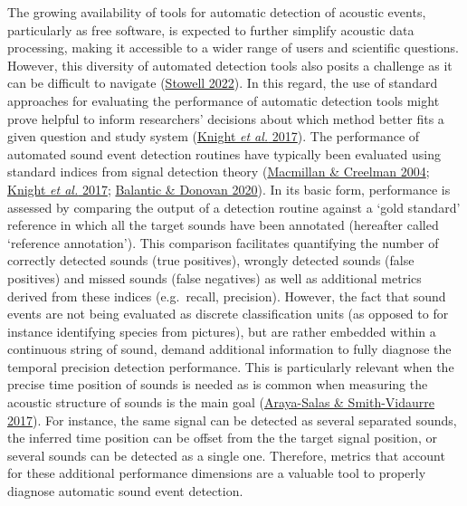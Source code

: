 \documentclass[
]{article}
\begin{document}
The growing availability of tools for automatic detection of acoustic
events, particularly as free software, is expected to further simplify
acoustic data processing, making it accessible to a wider range of users
and scientific questions. However, this diversity of automated detection
tools also posits a challenge as it can be difficult to navigate
(\protect\hyperlink{ref-Stowell2022}{Stowell 2022}). In this regard, the
use of standard approaches for evaluating the performance of automatic
detection tools might prove helpful to inform researchers' decisions
about which method better fits a given question and study system
(\protect\hyperlink{ref-knight2017}{Knight \emph{et al.} 2017}). The
performance of automated sound event detection routines have typically
been evaluated using standard indices from signal detection theory
(\protect\hyperlink{ref-macmillan2004}{Macmillan \& Creelman 2004};
\protect\hyperlink{ref-knight2017}{Knight \emph{et al.} 2017};
\protect\hyperlink{ref-balantic2020}{Balantic \& Donovan 2020}). In its
basic form, performance is assessed by comparing the output of a
detection routine against a `gold standard' reference in which all the
target sounds have been annotated (hereafter called `reference
annotation'). This comparison facilitates quantifying the number of
correctly detected sounds (true positives), wrongly detected sounds
(false positives) and missed sounds (false negatives) as well as
additional metrics derived from these indices (e.g.~recall, precision).
However, the fact that sound events are not being evaluated as discrete
classification units (as opposed to for instance identifying species
from pictures), but are rather embedded within a continuous string of
sound, demand additional information to fully diagnose the temporal
precision detection performance. This is particularly relevant when the
precise time position of sounds is needed as is common when measuring
the acoustic structure of sounds is the main goal
(\protect\hyperlink{ref-Araya-Salas2017f}{Araya-Salas \& Smith-Vidaurre
2017}). For instance, the same signal can be detected as several
separated sounds, the inferred time position can be offset from the the
target signal position, or several sounds can be detected as a single
one. Therefore, metrics that account for these additional performance
dimensions are a valuable tool to properly diagnose automatic sound
event detection.
\end{document}
